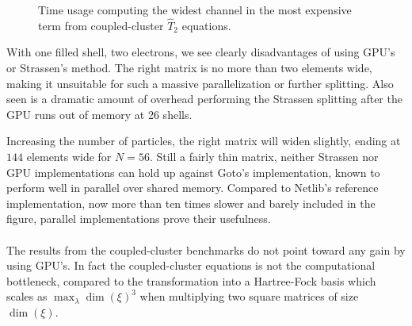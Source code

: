 \begin{figure}
\begin{center}
{}
\caption{Time usage computing the widest channel in the most expensive term from coupled-cluster $\hat{T}_2$ equations.}
\label{fig:results:timeMultCC}
\end{center}
\end{figure}

With one filled shell, two electrons, we see clearly disadvantages of using GPU's or Strassen's method.
The right matrix is no more than two elements wide, making it unsuitable for such a massive parallelization or further splitting.
Also seen is a dramatic amount of overhead performing the Strassen splitting after the GPU runs out of memory at 26 shells.

Increasing the number of particles, the right matrix will widen slightly, ending at $144$ elements wide for $N=56$.
Still a fairly thin matrix, neither Strassen nor GPU implementations can hold up against Goto's implementation, known to perform well in parallel over shared memory.
Compared to Netlib's reference implementation, now more than ten times slower and barely included in the figure, parallel implementations prove their usefulness.




\paragraph{}
The results from the coupled-cluster benchmarks do not point toward any gain by using GPU's.
In fact the coupled-cluster equations is not the computational bottleneck, compared to the transformation into a Hartree-Fock basis which scales as $ \max_{\lambda}\dim(\xi)^3$ when multiplying two square matrices of size $\dim(\xi)$.


